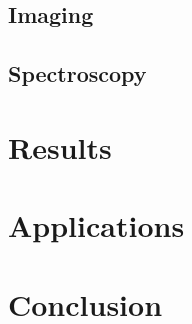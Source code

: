 \documentclass[11pt,sigconf]{acmart}
\begin{document}
\subsection{Imaging}


\subsection{Spectroscopy}


\section{Results}





\section{Applications}




\section{Conclusion}






 
\end{document}
